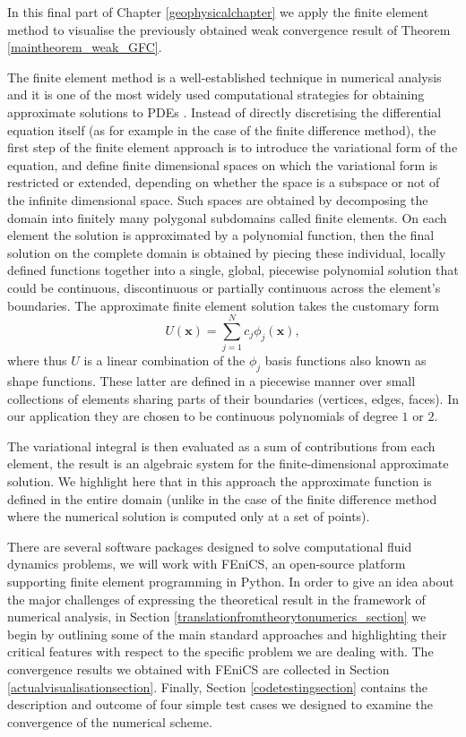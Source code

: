\documentclass[12pt]{report}
\numberwithin{theorem}{chapter}
\numberwithin{corollary}{chapter}
\numberwithin{lemma}{chapter}
\numberwithin{remark}{chapter}
\numberwithin{definition}{chapter}
\numberwithin{prop}{chapter}
\begin{document}
In this final part of Chapter \ref{geophysicalchapter} we apply the finite element method to visualise the previously obtained weak convergence result of Theorem \ref{maintheorem_weak_GFC}.

The finite element method is a well-established technique in numerical analysis and it is one of the most widely used computational strategies for obtaining approximate solutions to PDEs \cite{jing-fem}. Instead of directly discretising the differential equation itself (as for example in the case of the finite difference method), the first step of the finite element approach is to introduce the variational form of the equation, and define finite dimensional spaces on which the variational form is restricted or extended, depending on whether the space is a subspace or not of the infinite dimensional space. Such spaces are obtained by decomposing the domain into finitely many polygonal subdomains called finite elements. On each element the solution is approximated by a polynomial function, then the final solution on the complete domain is obtained by piecing these individual, locally defined functions together into a single, global, piecewise polynomial solution that could be continuous, discontinuous or partially continuous across the element's boundaries. The approximate finite element solution takes the customary form
%
$$ U (\mathbf{x}) = \sum_{j=1}^N c_j \phi_j(\mathbf{x}),$$
%
where thus $U$ is a linear combination of the $\phi_j$ basis functions also known as shape functions. These latter are defined in a piecewise manner over small collections of elements sharing parts of their boundaries (vertices, edges, faces). In our application they are chosen to be continuous polynomials of degree $1$ or $2$.

The variational integral is then evaluated as a sum of contributions from each element, the result is an algebraic system for the finite-dimensional approximate solution. We highlight here that in this approach the approximate function is defined in the entire domain (unlike in the case of the finite difference method where the numerical solution is computed only at a set of points).

There are several software packages designed to solve computational fluid dynamics problems, we will work with FEniCS, an open-source platform supporting finite element programming in Python. In order to give an idea about the major challenges of expressing the theoretical result in the framework of numerical analysis, in Section \ref{translationfromtheorytonumerics_section} we begin by outlining some of the main standard approaches and highlighting their critical features with respect to the specific problem we are dealing with. The convergence results we obtained with FEniCS are collected in Section \ref{actualvisualisationsection}. Finally, Section \ref{codetestingsection} contains the description and outcome of four simple test cases we designed to examine the convergence of the numerical scheme.
\end{document}

